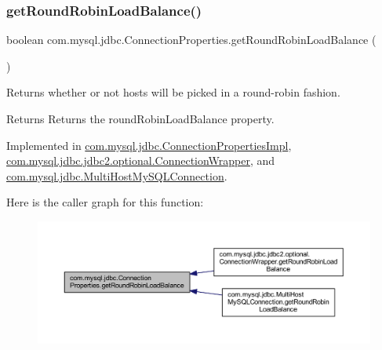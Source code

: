 \subsubsection{\texorpdfstring{get\+Round\+Robin\+Load\+Balance()}{getRoundRobinLoadBalance()}}
{\footnotesize\ttfamily boolean com.\+mysql.\+jdbc.\+Connection\+Properties.\+get\+Round\+Robin\+Load\+Balance (\begin{DoxyParamCaption}{ }\end{DoxyParamCaption})}

Returns whether or not hosts will be picked in a round-\/robin fashion.

\begin{DoxyReturn}{Returns}
Returns the round\+Robin\+Load\+Balance property. 
\end{DoxyReturn}


Implemented in \mbox{\hyperlink{classcom_1_1mysql_1_1jdbc_1_1_connection_properties_impl_ab5b838d6a5a885610d48c21ec6380d84}{com.\+mysql.\+jdbc.\+Connection\+Properties\+Impl}}, \mbox{\hyperlink{classcom_1_1mysql_1_1jdbc_1_1jdbc2_1_1optional_1_1_connection_wrapper_ac03ab6e1fcc1af0837d88f0db05b1407}{com.\+mysql.\+jdbc.\+jdbc2.\+optional.\+Connection\+Wrapper}}, and \mbox{\hyperlink{classcom_1_1mysql_1_1jdbc_1_1_multi_host_my_s_q_l_connection_a262fd54d367adf5972243b82981778ad}{com.\+mysql.\+jdbc.\+Multi\+Host\+My\+S\+Q\+L\+Connection}}.

Here is the caller graph for this function\+:\nopagebreak
\begin{figure}[H]
\begin{center}
\leavevmode
\includegraphics[width=350pt]{interfacecom_1_1mysql_1_1jdbc_1_1_connection_properties_a48b88c077dbb42077a1fb257aab4558f_icgraph}
\end{center}
\end{figure}
\mbox{\label{interfacecom_1_1mysql_1_1jdbc_1_1_connection_properties_ac861d675728756c06dd2984057b95ab6}} 
